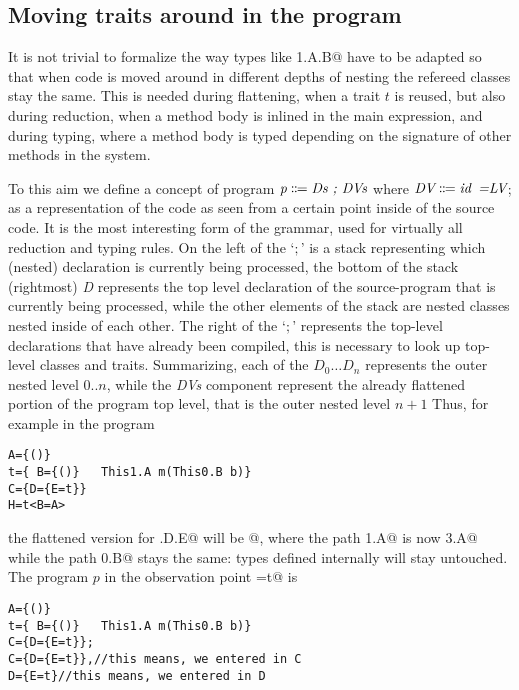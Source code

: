 \subsection{Moving traits around in the program}
It is not trivial to formalize the way types like \Q@This1.A.B@ %
have to be adapted so that when code is moved around in different depths of nesting the 
refereed classes stay the same.
This is needed during flattening, when a trait $t$ is reused, but also during reduction, when a method body is inlined in the main expression, and during typing, where a method body is typed depending on the signature of other methods in the system.

To this aim we define a concept of program 
$\textit{p}\Coloneqq\textit{Ds\Q{;} DVs}$
where 
$\textit{DV}\Coloneqq\textit{id\eq{LV}}$; as a representation of 
the code as seen from a certain point inside of the source code. It is the most interesting form of the grammar,
used for virtually all reduction and typing rules. On the left of the `$;$' is a stack representing which (nested) declaration is currently being processed,
 the bottom of the stack (rightmost) \textit{D} represents the top level declaration of the source-program that is currently being processed, while the other elements of the stack are nested classes nested inside of each other.
  The right of the `$;$' represents the top-level declarations that have already been compiled, this is necessary to look up top-level classes and traits.
Summarizing, each of the $\textit{D}_0\ldots\textit{D}_n$
represents the outer nested level $0..n$, while
the \textit{DVs} component represent the already flattened portion of the program top level, that is 
the outer nested level $n+1$
Thus, for example in the program
\begin{lstlisting}
A={()}
t={ B={()}   This1.A m(This0.B b)}
C={D={E=t}}
H=t<B=A>
\end{lstlisting}
the flattened version for \Q@C.D.E@ will be 
@, where the path
\Q@This1.A@ is now \Q@This3.A@ while the path \Q@This0.B@ stays the same: types defined internally will
stay untouched.
The program $p$ in the observation point \Q@E=t@ is
\begin{lstlisting}
A={()}
t={ B={()}   This1.A m(This0.B b)}
C={D={E=t}};
C={D={E=t}},//this means, we entered in C
D={E=t}//this means, we entered in D
\end{lstlisting}

